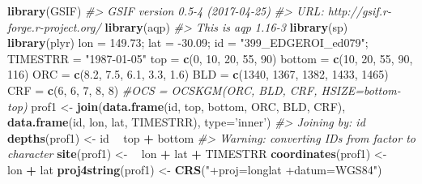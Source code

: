 \documentclass[graybox,natbib,nospthms,UStrade]{svmono}
\newenvironment{Shaded}{\begin{snugshade}}{\end{snugshade}}
\newcommand{\CommentTok}[1]{\textcolor[rgb]{0.37,0.37,0.37}{\textit{#1}}}
\newcommand{\DataTypeTok}[1]{\textcolor[rgb]{0.27,0.27,0.27}{#1}}
\newcommand{\DecValTok}[1]{\textcolor[rgb]{0.06,0.06,0.06}{#1}}
\newcommand{\ErrorTok}[1]{\textcolor[rgb]{0.14,0.14,0.14}{\textbf{#1}}}
\newcommand{\FloatTok}[1]{\textcolor[rgb]{0.06,0.06,0.06}{#1}}
\newcommand{\KeywordTok}[1]{\textcolor[rgb]{0.27,0.27,0.27}{\textbf{#1}}}
\newcommand{\NormalTok}[1]{#1}
\newcommand{\OperatorTok}[1]{\textcolor[rgb]{0.43,0.43,0.43}{\textbf{#1}}}
\newcommand{\StringTok}[1]{\textcolor[rgb]{0.5,0.5,0.5}{#1}}
\begin{document}
\begin{Shaded}
\begin{Highlighting}[]
\KeywordTok{library}\NormalTok{(GSIF)}
\CommentTok{#> GSIF version 0.5-4 (2017-04-25)}
\CommentTok{#> URL: http://gsif.r-forge.r-project.org/}
\KeywordTok{library}\NormalTok{(aqp)}
\CommentTok{#> This is aqp 1.16-3}
\KeywordTok{library}\NormalTok{(sp)}
\KeywordTok{library}\NormalTok{(plyr)}
\NormalTok{lon =}\StringTok{ }\FloatTok{149.73}\NormalTok{; lat =}\StringTok{ }\FloatTok{-30.09}\NormalTok{; }
\NormalTok{id =}\StringTok{ "399_EDGEROI_ed079"}\NormalTok{; TIMESTRR =}\StringTok{ "1987-01-05"}
\NormalTok{top =}\StringTok{ }\KeywordTok{c}\NormalTok{(}\DecValTok{0}\NormalTok{, }\DecValTok{10}\NormalTok{, }\DecValTok{20}\NormalTok{, }\DecValTok{55}\NormalTok{, }\DecValTok{90}\NormalTok{) }
\NormalTok{bottom =}\StringTok{ }\KeywordTok{c}\NormalTok{(}\DecValTok{10}\NormalTok{, }\DecValTok{20}\NormalTok{, }\DecValTok{55}\NormalTok{, }\DecValTok{90}\NormalTok{, }\DecValTok{116}\NormalTok{)}
\NormalTok{ORC =}\StringTok{ }\KeywordTok{c}\NormalTok{(}\FloatTok{8.2}\NormalTok{, }\FloatTok{7.5}\NormalTok{, }\FloatTok{6.1}\NormalTok{, }\FloatTok{3.3}\NormalTok{, }\FloatTok{1.6}\NormalTok{)}
\NormalTok{BLD =}\StringTok{ }\KeywordTok{c}\NormalTok{(}\DecValTok{1340}\NormalTok{, }\DecValTok{1367}\NormalTok{, }\DecValTok{1382}\NormalTok{, }\DecValTok{1433}\NormalTok{, }\DecValTok{1465}\NormalTok{)}
\NormalTok{CRF =}\StringTok{ }\KeywordTok{c}\NormalTok{(}\DecValTok{6}\NormalTok{, }\DecValTok{6}\NormalTok{, }\DecValTok{7}\NormalTok{, }\DecValTok{8}\NormalTok{, }\DecValTok{8}\NormalTok{)}
\CommentTok{#OCS = OCSKGM(ORC, BLD, CRF, HSIZE=bottom-top)}
\NormalTok{prof1 <-}\StringTok{ }\KeywordTok{join}\NormalTok{(}\KeywordTok{data.frame}\NormalTok{(id, top, bottom, ORC, BLD, CRF), }
               \KeywordTok{data.frame}\NormalTok{(id, lon, lat, TIMESTRR), }\DataTypeTok{type=}\StringTok{'inner'}\NormalTok{)}
\CommentTok{#> Joining by: id}
\KeywordTok{depths}\NormalTok{(prof1) <-}\StringTok{ }\NormalTok{id }\OperatorTok{~}\StringTok{ }\NormalTok{top }\OperatorTok{+}\StringTok{ }\NormalTok{bottom}
\CommentTok{#> Warning: converting IDs from factor to character}
\KeywordTok{site}\NormalTok{(prof1) <-}\StringTok{ }\ErrorTok{~}\StringTok{ }\NormalTok{lon }\OperatorTok{+}\StringTok{ }\NormalTok{lat }\OperatorTok{+}\StringTok{ }\NormalTok{TIMESTRR}
\KeywordTok{coordinates}\NormalTok{(prof1) <-}\StringTok{ }\ErrorTok{~}\StringTok{ }\NormalTok{lon }\OperatorTok{+}\StringTok{ }\NormalTok{lat}
\KeywordTok{proj4string}\NormalTok{(prof1) <-}\StringTok{ }\KeywordTok{CRS}\NormalTok{(}\StringTok{"+proj=longlat +datum=WGS84"}\NormalTok{)}

\end{Highlighting}
\end{Shaded}
\end{document}

